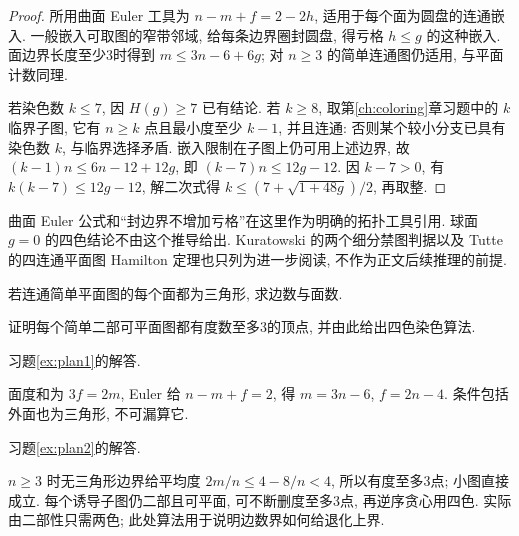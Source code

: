 \begin{proof}
所用曲面 Euler 工具为 $n-m+f=2-2h$, 适用于每个面为圆盘的连通嵌入. 一般嵌入可取图的窄带邻域, 给每条边界圈封圆盘, 得亏格 $h\le g$ 的这种嵌入. 面边界长度至少3时得到 $m\le3n-6+6g$; 对 $n\ge3$ 的简单连通图仍适用, 与平面计数同理.

若染色数 $k\le7$, 因 $H(g)\ge7$ 已有结论. 若 $k\ge8$, 取第\ref{ch:coloring}章习题中的 $k$ 临界子图, 它有 $n\ge k$ 点且最小度至少 $k-1$, 并且连通: 否则某个较小分支已具有染色数 $k$, 与临界选择矛盾. 嵌入限制在子图上仍可用上述边界, 故 $(k-1)n\le6n-12+12g$, 即 $(k-7)n\le12g-12$. 因 $k-7>0$, 有 $k(k-7)\le12g-12$, 解二次式得 $k\le(7+\sqrt{1+48g})/2$, 再取整.
\end{proof}
曲面 Euler 公式和“封边界不增加亏格”在这里作为明确的拓扑工具引用. 球面 $g=0$ 的四色结论不由这个推导给出. Kuratowski 的两个细分禁图判据以及 Tutte 的四连通平面图 Hamilton 定理也只列为进一步阅读, 不作为正文后续推理的前提.
\begin{exercise}\label{ex:plan1}
若连通简单平面图的每个面都为三角形, 求边数与面数.
\end{exercise}
\begin{exercise}\label{ex:plan2}
证明每个简单二部可平面图都有度数至多3的顶点, 并由此给出四色染色算法.
\end{exercise}
习题\ref{ex:plan1}的解答.
\begin{solution}
面度和为 $3f=2m$, Euler 给 $n-m+f=2$, 得 $m=3n-6$, $f=2n-4$. 条件包括外面也为三角形, 不可漏算它.
\end{solution}
习题\ref{ex:plan2}的解答.
\begin{solution}
$n\ge3$ 时无三角形边界给平均度 $2m/n\le4-8/n<4$, 所以有度至多3点; 小图直接成立. 每个诱导子图仍二部且可平面, 可不断删度至多3点, 再逆序贪心用四色. 实际由二部性只需两色; 此处算法用于说明边数界如何给退化上界.
\end{solution}
